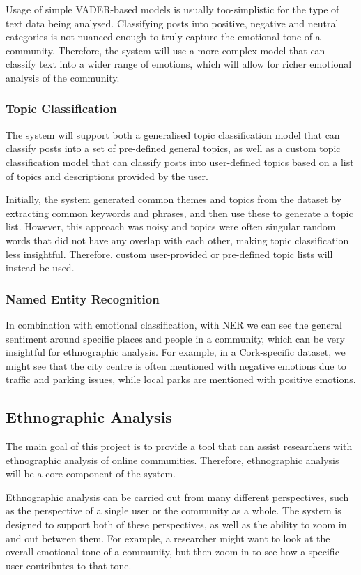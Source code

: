 \documentclass[12pt, a4paper]{article}
\begin{document}
Usage of simple VADER-based models is usually too-simplistic for the type of text data being analysed. Classifying posts into positive, negative and neutral categories is not nuanced enough to truly capture the emotional tone of a community. Therefore, the system will use a more complex model that can classify text into a wider range of emotions, which will allow for richer emotional analysis of the community.

\subsubsection{Topic Classification}
The system will support both a generalised topic classification model that can classify posts into a set of pre-defined general topics, as well as a custom topic classification model that can classify posts into user-defined topics based on a list of topics and descriptions provided by the user.

Initially, the system generated common themes and topics from the dataset by extracting common keywords and phrases, and then use these to generate a topic list. However, this approach was noisy and topics were often singular random words that did not have any overlap with each other, making topic classification less insightful. Therefore, custom user-provided or pre-defined topic lists will instead be used.

\subsubsection{Named Entity Recognition}
In combination with emotional classification, with NER we can see the general sentiment around specific places and people in a community, which can be very insightful for ethnographic analysis. For example, in a Cork-specific dataset, we might see that the city centre is often mentioned with negative emotions due to traffic and parking issues, while local parks are mentioned with positive emotions.

\subsection{Ethnographic Analysis}
The main goal of this project is to provide a tool that can assist researchers with ethnographic analysis of online communities. Therefore, ethnographic analysis will be a core component of the system.

Ethnographic analysis can be carried out from many different perspectives, such as the perspective of a single user or the community as a whole. The system is designed to support both of these perspectives, as well as the ability to zoom in and out between them. For example, a researcher might want to look at the overall emotional tone of a community, but then zoom in to see how a specific user contributes to that tone.
\end{document}
